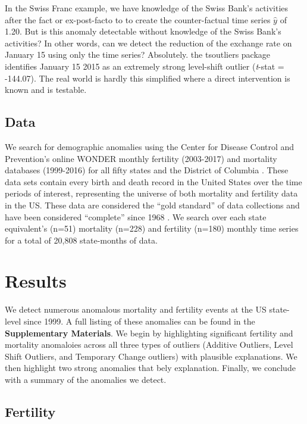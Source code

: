 \documentclass[12pt]{article}
\begin{document}
In the Swiss Franc example, we have knowledge of the Swiss Bank's
activities after the fact or ex-post-facto to to create the
counter-factual time series \(\hat{y}\) of 1.20. But is this anomaly
detectable without knowledge of the Swiss Bank's activities? In other
words, can we detect the reduction of the exchange rate on January 15
using only the time series? Absolutely. the tsoutliers package
identifies January 15 2015 as an extremely strong level-shift outlier
(\emph{t}-stat = -144.07). The real world is hardly this simplified
where a direct intervention is known and is testable.

\hypertarget{data}{%
\subsection{Data}\label{data}}

We search for demographic anomalies using the Center for Disease Control
and Prevention's online WONDER monthly fertility (2003-2017) and
mortality databases (1999-2016) for all fifty states and the District of
Columbia \citep{CDC_fert07, CDC_mort}. These data sets contain every
birth and death record in the United States over the time periods of
interest, representing the universe of both mortality and fertility data
in the US. These data are considered the ``gold standard'' of data
collections \citep{mahapatra2007civil} and have been considered
``complete'' since 1968 \citep{hetzel2016us}. We search over each state
equivalent's (n=51) mortality (n=228) and fertility (n=180) monthly time
series for a total of 20,808 state-months of data.

\hypertarget{results}{%
\section{Results}\label{results}}

We detect numerous anomalous mortality and fertility events at the US
state-level since 1999. A full listing of these anomalies can be found
in the \textbf{Supplementary Materials}. We begin by highlighting
significant fertility and mortality anomaloies across all three types of
outliers (Additive Outliers, Level Shift Outliers, and Temporary Change
outliers) with plausible explanations. We then highlight two strong
anomalies that bely explanation. Finally, we conclude with a summary of
the anomalies we detect.

\hypertarget{fertility}{%
\subsection{Fertility}\label{fertility}}
\end{document}
